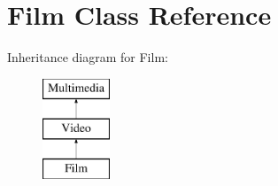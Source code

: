 \hypertarget{class_film}{}\section{Film Class Reference}
\label{class_film}
Inheritance diagram for Film\+:\begin{figure}[H]
\begin{center}
\leavevmode
\includegraphics[height=3.000000cm]{class_film}
\end{center}
\end{figure}
